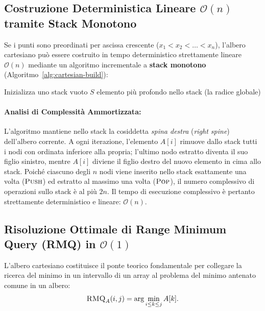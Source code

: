 \subsection{Costruzione Deterministica Lineare $\mathcal{O}(n)$ tramite Stack Monotono}
Se i punti sono preordinati per ascissa crescente ($x_1 < x_2 < \dots < x_n$), l'albero cartesiano pu\`o essere costruito in tempo deterministico strettamente lineare $\mathcal{O}(n)$ mediante un algoritmo incrementale a \textbf{stack monotono} (Algoritmo~\ref{alg:cartesian-build}):

\begin{algorithm}[H]
\caption{Costruzione Lineare dell'Albero Cartesiano ($\textsc{Build-Cartesian}(A[1 \dots n])$)}
\label{alg:cartesian-build}
\BlankLine
Inizializza uno stack vuoto $S$\;
\Return elemento pi\`u profondo nello stack (la radice globale)\;
\end{algorithm}

\paragraph{Analisi di Complessit\`a Ammortizzata:}
L'algoritmo mantiene nello stack la cosiddetta \textit{spina destra} (\textit{right spine}) dell'albero corrente. A ogni iterazione, l'elemento $A[i]$ rimuove dallo stack tutti i nodi con ordinata inferiore alla propria; l'ultimo nodo estratto diventa il suo figlio sinistro, mentre $A[i]$ diviene il figlio destro del nuovo elemento in cima allo stack. Poich\'e ciascuno degli $n$ nodi viene inserito nello stack esattamente una volta ($\textsc{Push}$) ed estratto al massimo una volta ($\textsc{Pop}$), il numero complessivo di operazioni sullo stack \`e al pi\`u $2n$. Il tempo di esecuzione complessivo \`e pertanto strettamente deterministico e lineare: $\mathcal{O}(n)$.

\subsection{Risoluzione Ottimale di Range Minimum Query (RMQ) in $\mathcal{O}(1)$}
L'albero cartesiano costituisce il ponte teorico fondamentale per collegare la ricerca del minimo in un intervallo di un array al problema del minimo antenato comune in un albero:
\begin{equation}
  \textsc{RMQ}_A(i, j) = \arg\min_{i \le k \le j} A[k].
\end{equation}

